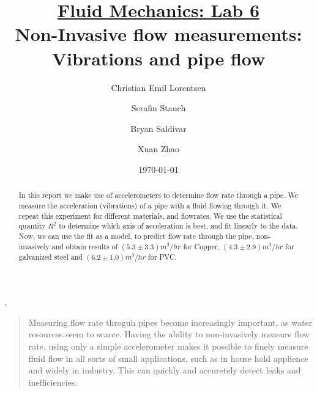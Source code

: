 \documentclass[%
 aapm,
 mph,%
 amsmath,amssymb,
 reprint,%
]{revtex4-2}
\begin{document}
\noindent
{}

\title[]{\underline{Fluid Mechanics: Lab 6} \\
Non-Invasive flow measurements: Vibrations and pipe flow}.%

\author{Christian Emil Lorentsen}%
\author{Serafin Stauch}
\author{Bryan Saldivar}
\author{Xuan Zhao}

\date{\today}%
\begin{abstract}
In this report we make use of accelerometers to determine flow rate through a pipe. We measure the acceleration (vibrations) of a pipe with a fluid flowing through it. We repeat this experiment for different materials, and flowrates. We use the statistical quantity $R^2$ to determine which axis of acceleration is best, and fit linearly to the data. Now, we can use the fit as a model, to predict flow rate through the pipe, non-invasively and obtain results of $(5.3\pm 3.3)m^3/hr$ for Copper, $(4.3\pm 2.9)m^3/hr$ for galvanized steel and $(6.2\pm 1.0)m^3/hr$ for PVC.

\end{abstract}

\maketitle
\linenumbers\relax %
\begin{quotation}
Measuring flow rate throguh pipes become increasingly important, as water resources seem to scarce. Having the ability to non-invasively measure flow rate, using only a simple accelerometer makes it possible to finely measure fluid flow in all sorts of small applications, such as in house hold applience and widely in industry. This can quickly and accuretely detect leaks and inefficiencies.

\end{quotation}
% 
% 
\end{document}
